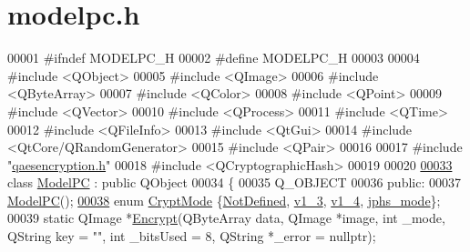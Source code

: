 \hypertarget{modelpc_8h_source}{}\section{modelpc.\+h}
\label{modelpc_8h_source}

\begin{DoxyCode}
00001 \textcolor{preprocessor}{#ifndef MODELPC\_H}
00002 \textcolor{preprocessor}{#define MODELPC\_H}
00003 
00004 \textcolor{preprocessor}{#include <QObject>}
00005 \textcolor{preprocessor}{#include <QImage>}
00006 \textcolor{preprocessor}{#include <QByteArray>}
00007 \textcolor{preprocessor}{#include <QColor>}
00008 \textcolor{preprocessor}{#include <QPoint>}
00009 \textcolor{preprocessor}{#include <QVector>}
00010 \textcolor{preprocessor}{#include <QProcess>}
00011 \textcolor{preprocessor}{#include <QTime>}
00012 \textcolor{preprocessor}{#include <QFileInfo>}
00013 \textcolor{preprocessor}{#include <QtGui>}
00014 \textcolor{preprocessor}{#include <QtCore/QRandomGenerator>}
00015 \textcolor{preprocessor}{#include <QPair>}
00016 
00017 \textcolor{preprocessor}{#include "\hyperlink{qaesencryption_8h}{qaesencryption.h}"}
00018 \textcolor{preprocessor}{#include <QCryptographicHash>}
00019 
00020 
\hypertarget{modelpc_8h_source.tex_l00033}{}\hyperlink{class_model_p_c}{00033} \textcolor{keyword}{class }\hyperlink{class_model_p_c}{ModelPC} : \textcolor{keyword}{public} QObject
00034 \{
00035     Q\_OBJECT
00036 \textcolor{keyword}{public}:
00037     \hyperlink{class_model_p_c_ae12ebe65ec973c02a0de4850a7c1e31c}{ModelPC}();
\hypertarget{modelpc_8h_source.tex_l00038}{}\hyperlink{class_model_p_c_a296dd7afe3e1c49b3da25fd644fe4ceba43138df6b33a6b2bf608768907f95abc}{00038}     \textcolor{keyword}{enum} \hyperlink{class_model_p_c_a296dd7afe3e1c49b3da25fd644fe4ceb}{CryptMode} \{\hyperlink{class_model_p_c_a296dd7afe3e1c49b3da25fd644fe4ceba287198790ac9799acd03c99d63a6faea}{NotDefined}, \hyperlink{class_model_p_c_a296dd7afe3e1c49b3da25fd644fe4ceba7612e38de7178170655a56ddcf96e12c}{v1\_3}, \hyperlink{class_model_p_c_a296dd7afe3e1c49b3da25fd644fe4ceba43138df6b33a6b2bf608768907f95abc}{v1\_4}, \hyperlink{class_model_p_c_a296dd7afe3e1c49b3da25fd644fe4ceba90ca32d3ccbb6be224cdfc33f7096eea}{jphs\_mode}\};
00039     \textcolor{keyword}{static} QImage *\hyperlink{class_model_p_c_a271cf9285e32df58ffbfc918e6482bbd}{Encrypt}(QByteArray data, QImage *image, \textcolor{keywordtype}{int} \_mode, QString key = \textcolor{stringliteral}{""}, \textcolor{keywordtype}{int} 
      \_bitsUsed = 8, QString *\_error = \textcolor{keyword}{nullptr});

\end{DoxyCode}
